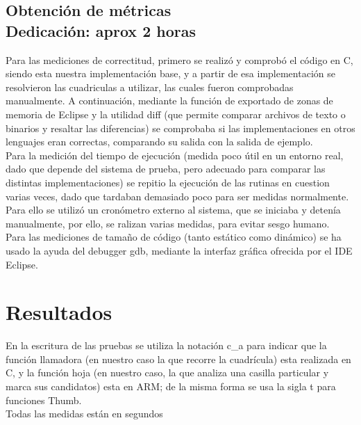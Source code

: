 \documentclass[12pt,letterpaper]{article}
\begin{document}
\subsection{Obtenci\'on de m\'etricas\\ {\small Dedicaci\'on: aprox 2 horas}}
Para las mediciones de correctitud, primero se realiz\'o y comprob\'o el
c\'odigo en C, siendo esta nuestra implementaci\'on base, y a partir de
esa implementaci\'on se resolvieron las cuadriculas a utilizar, las
cuales fueron comprobadas manualmente. A continuaci\'on, mediante la
funci\'on de exportado de zonas de memoria de Eclipse y la utilidad diff
(que permite comparar archivos de texto o binarios y resaltar las
diferencias) se comprobaba si las implementaciones en otros lenguajes
eran correctas, comparando su salida con la salida de ejemplo.\\
Para la medici\'on del tiempo de ejecuci\'on (medida poco \'util en un
entorno real, dado que depende del sistema de prueba, pero adecuado
para comparar las distintas implementaciones) se repitio la ejecuci\'on
de las rutinas en cuestion varias veces, dado que tardaban demasiado
poco para ser medidas normalmente. Para ello se utiliz\'o un cron\'ometro
externo al sistema, que se iniciaba y deten\'ia manualmente, por ello,
se ralizan varias medidas, para evitar sesgo humano.\\
Para las mediciones de tamaño de c\'odigo (tanto est\'atico como din\'amico)
se ha usado la ayuda del debugger gdb, mediante la interfaz gr\'afica
ofrecida por el IDE Eclipse.

\section{Resultados}
En la escritura de las pruebas se utiliza la notaci\'on c\_a para
indicar que la funci\'on llamadora (en nuestro caso la que recorre la
cuadr\'icula) esta realizada en C, y la funci\'on hoja (en nuestro
caso, la que analiza una casilla particular y marca sus candidatos)
esta en ARM; de la misma forma se usa la sigla t para funciones Thumb.\\
Todas las medidas est\'an en segundos
\end{document}
